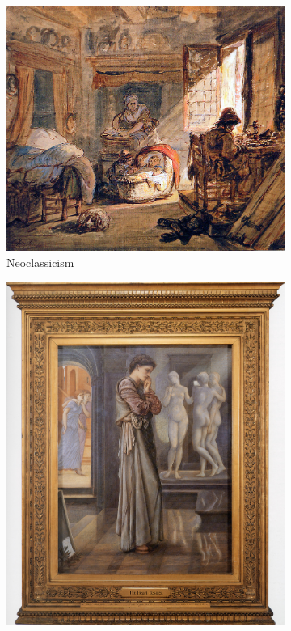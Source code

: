 \documentclass{article}
\begin{document}
\begin{figure}[hbt!]
	\centering
	\hfil
	\begin{subfigure}{.35\textwidth}
		\includegraphics[width=\linewidth]{images/abraham-van-strij_cobbler-and-his-family.jpg}
		\caption{Neoclassicism}
		\label{MLEDdet}
	\end{subfigure}
	\hfil
	\begin{subfigure}{.28\textwidth}
		\includegraphics[width=\linewidth]{images/edward-burne-jones_the-heart-desires.jpg}

\end{subfigure}
\end{figure}
\end{document}
